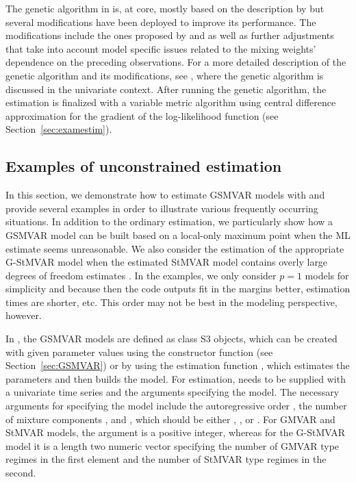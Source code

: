 \documentclass[nojss]{jss} %
\begin{document}
The genetic algorithm in  is, at core, mostly based on the description by \cite{Dorsey+Mayer:1995} but several modifications have been deployed to improve its performance. The modifications include the ones proposed by \cite{Patnaik+Srinivas:1994} and \cite{Smith+Dike+Stegmann:1995} as well as further adjustments that take into account model specific issues related to the mixing weights' dependence on the preceding observations. For a more detailed description of the genetic algorithm and its modifications, see \citet[Appendix A]{Virolainen:2021}, where the genetic algorithm is discussed in the univariate context. After running the genetic algorithm, the estimation is finalized with a variable metric algorithm \cite[algorithm 21, implemented by \citealp{R}]{Nash:1990} using central difference approximation for the gradient of the log-likelihood function (see Section~\ref{sec:examestim}).

\subsection{Examples of unconstrained estimation}\label{sec:example_estim}
In this section, we demonstrate how to estimate GSMVAR models with  and provide several examples in order to illustrate various frequently occurring situations. In addition to the ordinary estimation, we particularly show how a GSMVAR model can be built based on a local-only maximum point when the ML estimate seems unreasonable. We also consider the estimation of the appropriate G-StMVAR model when the estimated StMVAR model contains overly large degrees of freedom estimates \citep[see the related discussion in][]{Virolainen2:2021}. In the examples, we only consider $p=1$ models for simplicity and because then the code outputs fit in the margins better, estimation times are shorter, etc. This order may not be best in the modeling perspective, however.

In , the GSMVAR models are defined as class  S3 objects, which can be created with given parameter values using the constructor function  (see Section~\ref{sec:GSMVAR}) or by using the estimation function , which estimates the parameters and then builds the model. For estimation,  needs to be supplied with a univariate time series and the arguments specifying the model. The necessary arguments for specifying the model include the autoregressive order , the number of mixture components , and , which should be either , , or . For GMVAR and StMVAR models, the argument  is a positive integer, whereas for the G-StMVAR model it is a length two numeric vector specifying the number of GMVAR type regimes in the first element and the number of StMVAR type regimes in the second.
\end{document}
